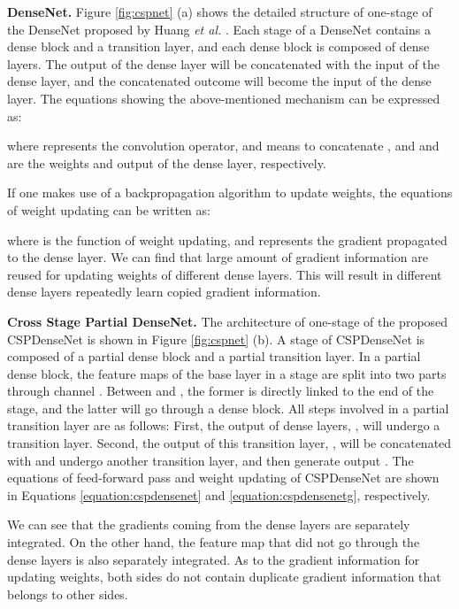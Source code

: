 \documentclass{article}
\begin{document}
{\bf DenseNet.} Figure \ref{fig:cspnet} (a) shows the detailed structure of one-stage of the DenseNet proposed by Huang \textit{et al.} \cite{huang2017densely}.  Each stage of a DenseNet contains a dense block and a transition layer, and each dense block is composed of  dense layers.  The output of the  dense layer will be concatenated with the input of the  dense layer, and the concatenated outcome will become the input of the  dense layer.  The equations showing the above-mentioned mechanism can be expressed as:


where  represents the convolution operator, and  means to concatenate , and  and  are the weights and output of the   dense layer, respectively.

If one makes use of a backpropagation algorithm to update weights, the equations of weight updating can be written as:


where  is the function of weight updating, and  represents the gradient propagated to the  dense layer.  We can find that large amount of gradient information are reused for updating weights of different dense layers.  This will result in different dense layers repeatedly learn copied gradient information.

{\bf Cross Stage Partial DenseNet.} The architecture of one-stage of the proposed CSPDenseNet is shown in Figure \ref{fig:cspnet} (b).  A stage of CSPDenseNet is composed of a partial dense block and a partial transition layer.  In a partial dense block, the feature maps of the base layer in a stage are split into two parts through channel .  Between  and , the former is directly linked to the end of the stage, and the latter will go through a dense block.  All steps involved in a partial transition layer are as follows: First, the output of dense layers, , will undergo a transition layer.  Second, the output of this transition layer, , will be concatenated with  and undergo another transition layer, and then generate output .  The equations of feed-forward pass and weight updating of CSPDenseNet are shown in Equations \ref{equation:cspdensenet} and \ref{equation:cspdensenetg}, respectively.





We can see that the gradients coming from the dense layers are separately integrated.  On the other hand, the feature map  that did not go through the dense layers is also separately integrated.  As to the gradient information for updating weights, both sides do not contain duplicate gradient information that belongs to other sides.  
\end{document}
